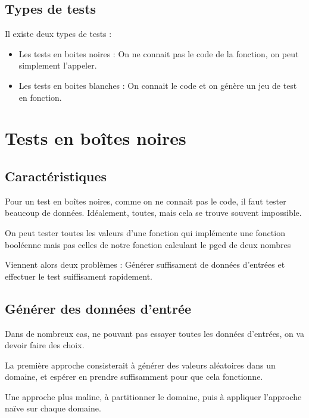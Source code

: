 \subsection{Types de tests}

Il existe deux types de tests : 
\begin{itemize}
	\item Les tests en boites noires : On ne connait pas le code de la fonction, on peut simplement l'appeler. 
	\item Les tests en boites blanches : On connait le code et on génère un jeu de test en fonction. 
\end{itemize}

\section{Tests en boîtes noires}

\subsection{Caractéristiques}

Pour un test en boîtes noires, comme on ne connait pas le code, il faut tester beaucoup de données. Idéalement, toutes, mais cela se trouve souvent impossible.

\begin{example}
	On peut tester toutes les valeurs d'une fonction qui implémente une fonction booléenne mais pas celles de notre fonction calculant le pgcd de deux nombres
\end{example}

Viennent alors deux problèmes : Générer suffisament de données d'entrées et effectuer le test suiffisament rapidement.

\subsection{Générer des données d'entrée}

Dans de nombreux cas, ne pouvant pas essayer toutes les données d'entrées, on va devoir faire des choix.

\begin{idee}
	La première approche consisterait à générer des valeurs aléatoires dans un domaine, et espérer en prendre suffisamment pour que cela fonctionne.
\end{idee}

\begin{principe}
	Une approche plus maline, à partitionner le domaine, puis à appliquer l'approche naïve sur chaque domaine.
\end{principe}

